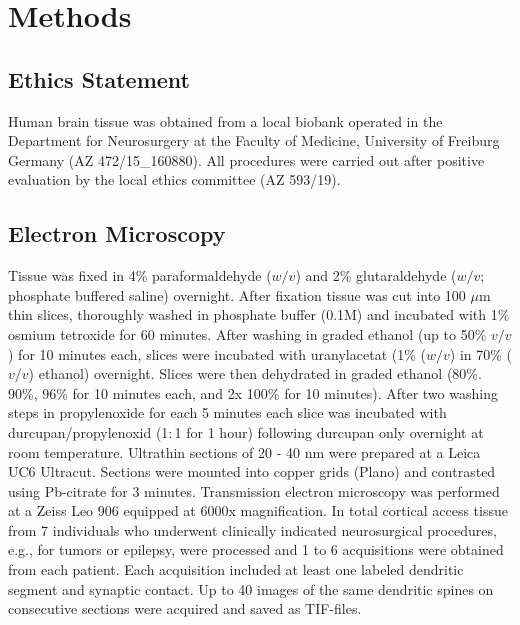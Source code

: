 \documentclass[fleqn,10pt]{wlscirep}
\begin{document}
\section*{Methods}

\subsection*{Ethics Statement}Human brain tissue was obtained from a local biobank operated in the Department for Neurosurgery at the Faculty of Medicine, University of Freiburg Germany (AZ 472/15\_160880). All procedures were carried out after positive evaluation by the local ethics committee (AZ 593/19). 

\subsection*{Electron Microscopy}
Tissue was fixed in 4\% paraformaldehyde ($w/v$) and 2\% glutaraldehyde ($w/v$; phosphate buffered saline) overnight. After fixation tissue was cut into 100 $\mu$m thin slices, thoroughly washed in phosphate buffer (0.1M) and incubated with 1\% osmium tetroxide for 60 minutes. After washing in graded ethanol (up to 50\% $v/v$) for 10 minutes each, slices were incubated with uranylacetat (1\% ($w/v$) in 70\% ($v/v$) ethanol) overnight. Slices were then dehydrated in graded ethanol (80\%. 90\%, 96\% for 10 minutes each, and 2x 100\% for 10 minutes). After two washing steps in propylenoxide for each 5 minutes each slice was incubated with durcupan/propylenoxid (1$:$1 for 1 hour) following durcupan only overnight at room temperature. Ultrathin sections of 20 - 40 nm were prepared at a Leica UC6 Ultracut. Sections were mounted into copper grids (Plano) and contrasted using Pb-citrate for 3 minutes. Transmission electron microscopy was performed at a Zeiss Leo 906 equipped at 6000x magnification. In total cortical access tissue from 7 individuals who underwent clinically indicated neurosurgical procedures, e.g., for tumors or epilepsy, were processed and 1 to 6 acquisitions were obtained from each patient. Each acquisition included at least one labeled dendritic segment and synaptic contact. Up to 40 images of the same dendritic spines on consecutive sections were acquired and saved as TIF-files. 
\end{document}
